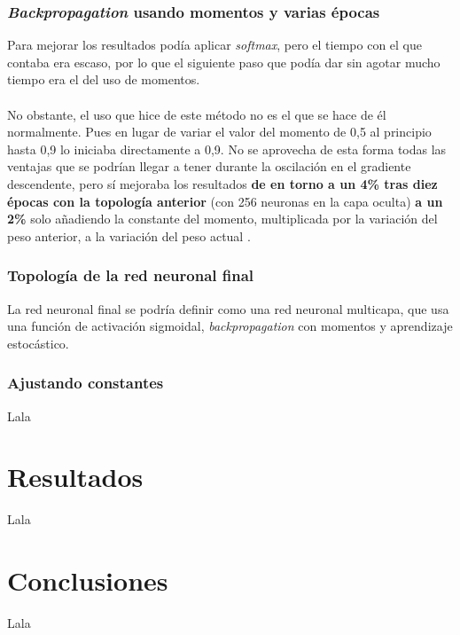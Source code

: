 \subsubsection{\textit{Backpropagation} usando momentos y varias épocas}

Para mejorar los resultados podía aplicar \textit{softmax}, pero el tiempo con el que contaba era escaso, por lo que el siguiente paso que podía dar sin agotar mucho tiempo era el del uso de momentos.
\\ \\
No obstante, el uso que hice de este método no es el que se hace de él normalmente. Pues en lugar de variar el valor del momento de 0,5 al principio hasta 0,9 lo iniciaba directamente a 0,9. No se aprovecha de esta forma todas las ventajas que se podrían llegar a tener durante la oscilación en el gradiente descendente, pero sí mejoraba los resultados \textbf{de en torno a un 4\% tras diez épocas con la topología anterior} (con 256 neuronas en la capa oculta) \textbf{a un 2\%} solo añadiendo la constante del momento, multiplicada por la variación del peso anterior, a la variación del peso actual \cite{backpropagation-au}.

\subsubsection{Topología de la red neuronal final}

La red neuronal final se podría definir como una red neuronal multicapa, que usa una función de activación sigmoidal, \textit{backpropagation} con momentos y aprendizaje estocástico.

\subsubsection{Ajustando constantes}

Lala

\section{Resultados}

Lala

\section{Conclusiones}

Lala



\newpage


